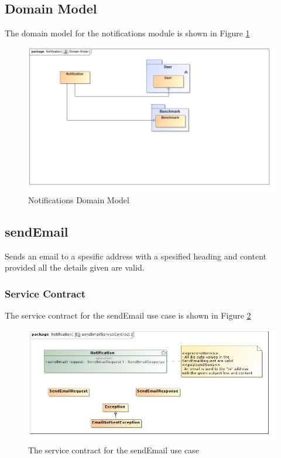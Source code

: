\subsection{Domain Model}
The domain model for the notifications module is shown in Figure \ref{Notifications Domain Model}
\begin{figure}[H]
	\begin{center}
		\includegraphics[scale=0.5]{../Diagrams and Charts/Notifications/Domain Model.jpg}  
		\caption{Notifications Domain Model}
	\end{center}
	\label{Notifications Domain Model}
\end{figure}

\subsection{sendEmail}
Sends an email to a spesific address with a spesified heading and content
provided all the details given are valid.

\subsubsection{Service Contract}
The service contract for the sendEmail use case is shown in Figure \ref{sendEmailServiceContract}
\begin{figure}[H]
	\begin{center}
		\includegraphics[scale=0.5]{../Diagrams and Charts/Notifications/sendEmailServiceContract.jpg}
		\caption{The service contract for the sendEmail use case}
	\end{center}
	\label{sendEmailServiceContract}
\end{figure}

